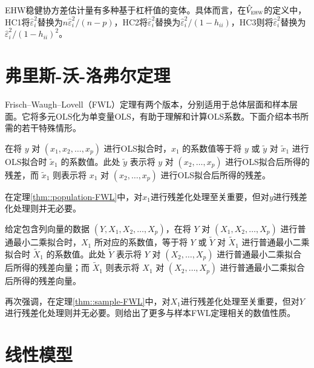 EHW稳健协方差估计量有多种基于杠杆值的变体\citep{long2000using}。具体而言，在$\hat{V}_\textsc{ehw}$的定义中，HC1将$\hat{\varepsilon}_i^2$替换为$n\hat{\varepsilon}_i^2/(n-p)$，HC2将$\hat{\varepsilon}_i^2$替换为$\hat{\varepsilon}_i^2 /(1 - h_{ii}) $，HC3则将$\hat{\varepsilon}_i^2$替换为$\hat{\varepsilon}_i^2/(1 - h_{ii})^2$。 

 


\section{弗里斯-沃-洛弗尔定理}
\label{appendix::fwl-theorem}

Frisch–Waugh–Lovell（FWL）定理有两个版本，分别适用于总体层面和样本层面。它将多元OLS化为单变量OLS，有助于理解和计算OLS系数。下面介绍本书所需的若干特殊情形。 

\begin{theorem}
[总体FWL]\label{thm::population-FWL}
在将 $y$ 对 $(x_1, x_2, \ldots, x_p)$ 进行OLS拟合时，$x_1$ 的系数值等于将 $y$ 或 $\tilde{y}$ 对 $\tilde{x}_1$ 进行OLS拟合时 $\tilde{x}_1$ 的系数值。此处 $\tilde{y}$ 表示将 $y$ 对 $(x_2, \ldots, x_p)$ 进行OLS拟合后所得的残差，而 $\tilde{x}_1$ 则表示将 $x_1$ 对 $(x_2, \ldots, x_p)$ 进行OLS拟合后所得的残差。
\end{theorem}


在定理\ref{thm::population-FWL}中，对$x_1$进行残差化处理至关重要，但对$y$进行残差化处理则并无必要。   



\begin{theorem}
[样本FWL]\label{thm::sample-FWL}
给定包含列向量的数据 $(Y, X_1, X_2, \ldots, X_p)$，在将 $Y$ 对 $(X_1, X_2, \ldots, X_p)$ 进行普通最小二乘拟合时，$X_1$ 所对应的系数值，等于将 $Y$ 或 $\tilde{Y}$ 对 $\tilde{X}_1$ 进行普通最小二乘拟合时 $\tilde{X}_1$ 的系数值。此处 $\tilde{Y}$ 表示将 $Y$ 对 $(X_2, \ldots, X_p)$ 进行普通最小二乘拟合后所得的残差向量；而 $\tilde{X}_1$ 则表示将 $X_1$ 对 $(X_2, \ldots, X_p)$ 进行普通最小二乘拟合后所得的残差向量。 
\end{theorem}


再次强调，在定理\ref{thm::sample-FWL}中，对$X_1$进行残差化处理至关重要，但对$Y$进行残差化处理则并无必要。\citet{ding2021frisch}则给出了更多与样本FWL定理相关的数值性质。
 

\section{线性模型}\label{section::linear-model-var}

